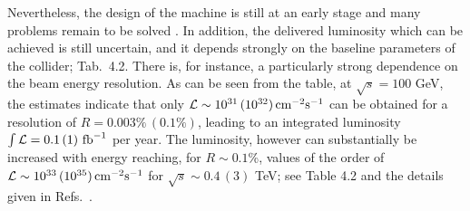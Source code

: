 Nevertheless, the design of the machine is still at an early stage and  many
problems remain to be solved \cite{mu-machine1,mu-machine2}.  In addition, the
delivered luminosity which can be achieved is still uncertain, and it depends
strongly on the baseline parameters of the collider; Tab.~4.2. There is, for 
instance, a particularly strong dependence on the beam energy resolution. As 
can be seen from the table, at $\sqrt s=100$ GeV, the estimates indicate that
only ${\cal 
L} \sim 10^{31}\, (10^{32})\, {\rm cm}^{-2}{\rm s}^{-1}$ can be obtained for a
resolution of $R= 0.003\%\, (0.1\%)$, leading to an integrated luminosity 
$\int {\cal L}=0.1\, (1)~{\rm fb}^{-1}$ per year. The luminosity, however can 
substantially be increased with energy reaching, for $R \sim 0.1$\%, values of 
the order of ${\cal L}\sim 10^{33}\, (10^{35})\, {\rm cm}^{-2}{\rm s}^{-1}$ for 
$\sqrt{s} \sim 0.4\, (3)$ TeV; see Table 4.2 and the details given in 
Refs.~\cite{mu-machine1,mu-machine2}. \s

